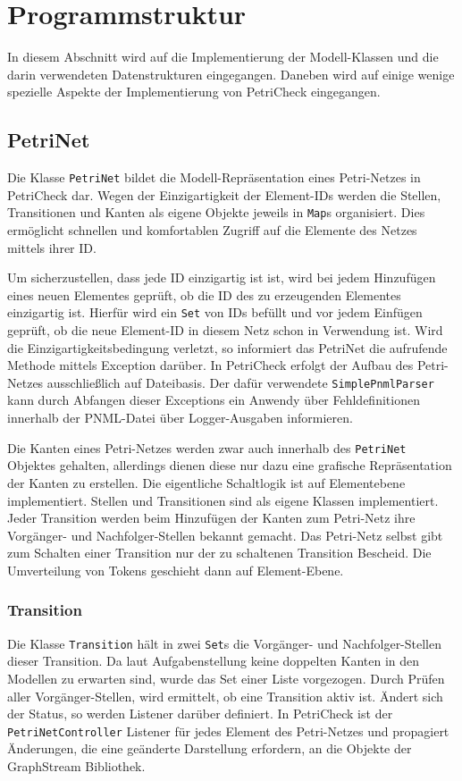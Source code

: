 \section{Programmstruktur}
\label{sec:struct}

In diesem Abschnitt wird auf die Implementierung der Modell-Klassen und die
darin verwendeten Datenstrukturen eingegangen. Daneben wird auf einige wenige
spezielle Aspekte der Implementierung von PetriCheck eingegangen.

\subsection{PetriNet}

Die Klasse \texttt{PetriNet} bildet die Modell-Repräsentation eines Petri-Netzes
in PetriCheck dar. Wegen der Einzigartigkeit der Element-IDs werden die Stellen,
Transitionen und Kanten als eigene Objekte jeweils in \texttt{Map}s
organisiert. Dies ermöglicht schnellen und komfortablen Zugriff auf die Elemente
des Netzes mittels ihrer ID.

Um sicherzustellen, dass jede ID einzigartig ist ist, wird bei jedem Hinzufügen
eines neuen Elementes geprüft, ob die ID des zu erzeugenden Elementes
einzigartig ist. Hierfür wird ein \texttt{Set} von IDs befüllt und vor jedem
Einfügen geprüft, ob die neue Element-ID in diesem Netz schon in Verwendung ist.
Wird die Einzigartigkeitsbedingung verletzt, so informiert das PetriNet die
aufrufende Methode mittels Exception darüber. In PetriCheck erfolgt der Aufbau
des Petri-Netzes ausschließlich auf Dateibasis. Der dafür verwendete
\texttt{SimplePnmlParser} kann durch Abfangen dieser Exceptions ein Anwendy über
Fehldefinitionen innerhalb der PNML-Datei über Logger-Ausgaben informieren.

Die Kanten eines Petri-Netzes werden zwar auch innerhalb des \texttt{PetriNet}
Objektes gehalten, allerdings dienen diese nur dazu eine grafische
Repräsentation der Kanten zu erstellen. Die eigentliche Schaltlogik ist auf
Elementebene implementiert. Stellen und Transitionen sind als eigene Klassen
implementiert. Jeder Transition werden beim Hinzufügen der Kanten zum Petri-Netz
ihre Vorgänger- und Nachfolger-Stellen bekannt gemacht. Das Petri-Netz selbst
gibt zum Schalten einer Transition nur der zu schaltenen Transition Bescheid.
Die Umverteilung von Tokens geschieht dann auf Element-Ebene.

\subsubsection{Transition}
Die Klasse \texttt{Transition} hält in zwei \texttt{Set}s die Vorgänger- und
Nachfolger-Stellen dieser Transition. Da laut Aufgabenstellung keine doppelten
Kanten in den Modellen zu erwarten sind, wurde das Set einer Liste vorgezogen.
Durch Prüfen aller Vorgänger-Stellen, wird ermittelt, ob eine Transition aktiv
ist. Ändert sich der Status, so werden Listener darüber definiert. In PetriCheck
ist der \texttt{PetriNetController} Listener für jedes Element des Petri-Netzes
und propagiert Änderungen, die eine geänderte Darstellung erfordern, an die
Objekte der GraphStream Bibliothek.

